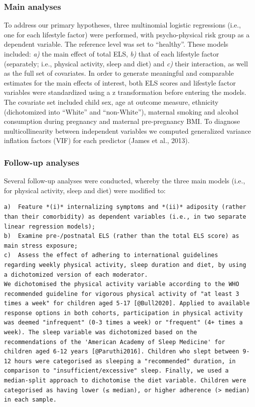 \documentclass[
  letterpaper,
  DIV=11,
  numbers=noendperiod]{scrreport}
\begin{document}
\subsubsection{Main analyses}\label{main-analyses}

To address our primary hypotheses, three multinomial logistic
regressions (i.e., one for each lifestyle factor) were performed, with
psycho-physical risk group as a dependent variable. The reference level
was set to ``healthy''. These models included: \emph{a)} the main effect
of total ELS, \emph{b)} that of each lifestyle factor (separately; i.e.,
physical activity, sleep and diet) and \emph{c)} their interaction, as
well as the full set of covariates. In order to generate meaningful and
comparable estimates for the main effects of interest, both ELS scores
and lifestyle factor variables were standardized using a z
transformation before entering the models. The covariate set included
child sex, age at outcome measure, ethnicity (dichotomized into
``White'' and ``non-White''), maternal smoking and alcohol consumption
during pregnancy and maternal pre-pregnancy BMI. To diagnose
multicollinearity between independent variables we computed generalized
variance inflation factors (VIF) for each predictor (James et al.,
2013).

\subsubsection{Follow-up analyses}\label{follow-up-analyses-1}

Several follow-up analyses were conducted, whereby the three main models
(i.e., for physical activity, sleep and diet) were modified to:

\begin{verbatim}
a)  Feature *(i)* internalizing symptoms and *(ii)* adiposity (rather than their comorbidity) as dependent variables (i.e., in two separate linear regression models);
b)  Examine pre-/postnatal ELS (rather than the total ELS score) as main stress exposure;
c)  Assess the effect of adhering to international guidelines regarding weekly physical activity, sleep duration and diet, by using a dichotomized version of each moderator. 
We dichotomised the physical activity variable according to the WHO recommended guideline for vigorous physical activity of "at least 3 times a week" for children aged 5-17 [@Bull2020]. Applied to available response options in both cohorts, participation in physical activity was deemed "infrequent" (0-3 times a week) or "frequent" (4+ times a week). The sleep variable was dichotomized based on the recommendations of the 'American Academy of Sleep Medicine' for children aged 6-12 years [@Paruthi2016]. Children who slept between 9-12 hours were categorised as sleeping a "recommended" duration, in comparison to "insufficient/excessive" sleep. Finally, we used a median-split approach to dichotomise the diet variable. Children were categorised as having lower (≤ median), or higher adherence (> median) in each sample.
\end{verbatim}
\end{document}

